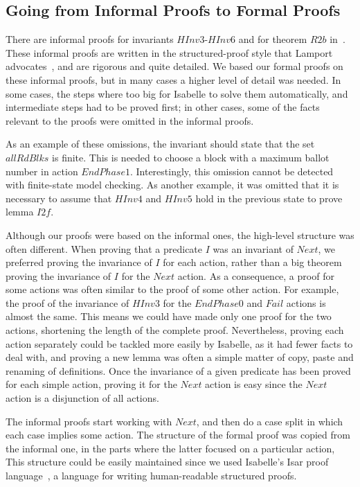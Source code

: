 \subsection{Going from Informal Proofs to Formal Proofs}
\tla
There are informal proofs for invariants
$HInv3$-$HInv6$ and for theorem $R2b$
in~\cite{Gafni00disk}. These informal proofs are written in the
structured-proof style that Lamport advocates~\cite{Lamport95how}, and
are rigorous and quite detailed. We based our formal proofs on these
informal proofs, but in many cases a higher level of detail was
needed. In some cases, the steps where too big for Isabelle to solve
them automatically, and intermediate steps had to be proved first; in
other cases, some of the facts relevant to the proofs were omitted in
the informal proofs.

As an example of these omissions, the invariant should state that the
set $allRdBlks$ is finite. This is needed to choose a block with a
maximum ballot number in action $EndPhase1$. Interestingly, this
omission cannot be detected with finite-state model checking. As
another example, it was omitted that it is necessary to assume that
$HInv4$ and $HInv5$ hold in the previous state to prove lemma $I2f$.

Although our proofs were based on the informal ones, the high-level
structure was often different. When proving that a predicate $I$ was
an invariant of $Next$, we preferred proving the invariance of $I$ for
each action, rather than a big theorem proving the invariance of $I$
for the $Next$ action.  As a consequence, a proof for some actions was
often similar to the proof of some other action. For example, the
proof of the invariance of $HInv3$ for the $EndPhase0$ and $Fail$
actions is almost the same. This means we could have made only one
proof for the two actions, shortening the length of the complete
proof.  Nevertheless, proving each action separately could be tackled
more easily by Isabelle, as it had fewer facts to deal with, and
proving a new lemma was often a simple matter of copy, paste and
renaming of definitions. Once the invariance of a given predicate has
been proved for each simple action, proving it for the $Next$ action is
easy since the $Next$ action is a disjunction of all
actions.

The informal proofs start working with $Next$, and then do a case
split in which each case implies some action. The structure of the
formal proof was copied from the informal one, in the parts where the
latter focused on a particular action, This structure could be easily
maintained since we used Isabelle's Isar proof
language~\cite{Wenzel02isabelleisar,Nipkow-TYPES02}, a language for
writing human-readable structured proofs.

